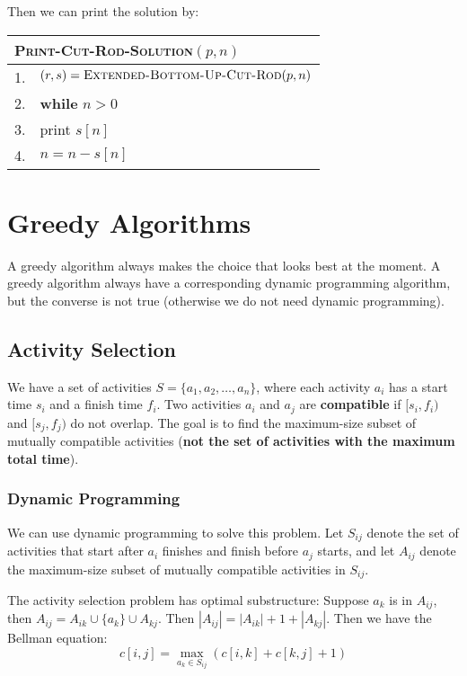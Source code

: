 \documentclass[a4paper,12pt]{article}
\begin{document}
Then we can print the solution by:
\begin{center}
	\begin{tabular}{rl}
		\toprule
		\multicolumn{2}{l}{\textsc{Print-Cut-Rod-Solution}$(p, n)$} \\
		\midrule
		1. & $(r, s) = \textsc{Extended-Bottom-Up-Cut-Rod}(p, n)$ \\
		2. & \textbf{while} $n > 0$ \\
		3. & \quad print $s[n]$ \\
		4. & \quad $n = n - s[n]$ \\
		\bottomrule
	\end{tabular}
\end{center}

\section{Greedy Algorithms}

A greedy algorithm always makes the choice that looks best at the moment.
A greedy algorithm always have a corresponding dynamic programming algorithm, but the converse is not true (otherwise we do not need dynamic programming).

\subsection{Activity Selection}

We have a set of activities $S = \{a_1, a_2, \dots, a_n\}$, where each activity $a_i$ has a start time $s_i$ and a finish time $f_i$.
Two activities $a_i$ and $a_j$ are \textbf{compatible} if $[s_i, f_i)$ and $[s_j, f_j)$ do not overlap.
The goal is to find the maximum-size subset of mutually compatible activities (\textbf{not the set of activities with the maximum total time}).

\subsubsection{Dynamic Programming}

We can use dynamic programming to solve this problem.
Let $S_{ij}$ denote the set of activities that start after $a_i$ finishes and finish before $a_j$ starts,
and let $A_{ij}$ denote the maximum-size subset of mutually compatible activities in $S_{ij}$.

The activity selection problem has optimal substructure:
Suppose $a_k$ is in $A_{ij}$, then $A_{ij} = A_{ik} \cup \{a_k\} \cup A_{kj}$.
Then $|A_{ij}| = |A_{ik}| + 1 + |A_{kj}|$.
Then we have the Bellman equation:
\begin{equation*}
	c[i, j] = \max_{a_k \in S_{ij}} (c[i, k] + c[k, j] + 1)
\end{equation*}
\end{document}
